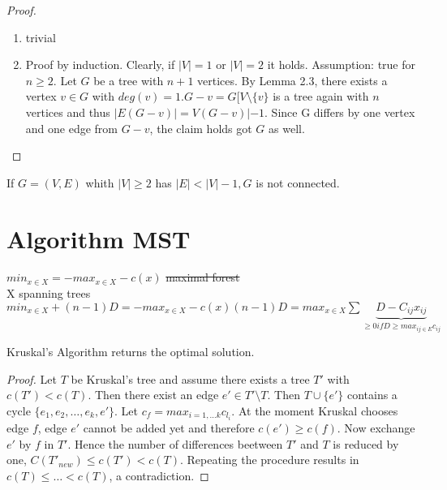 \begin{proof}



	\begin{enumerate}
		\item trivial
		\item Proof by induction. Clearly, if $|V|=1$ or $|V|=2$ it holds. Assumption: true for $n \geq 2.$
		Let $G$ be a tree with $n+1$ vertices. By Lemma 2.3, there exists a vertex $v \in G$ with $deg(v)=1. G-v=G[V\setminus \{v\}$ is a tree again with $n$ vertices and thus $|E(G-v)|=V(G-v)|-1$. Since G differs by one vertex and one edge from $G-v$, the claim holds got $G$ as well.
	\end{enumerate}
\end{proof}


\begin{lem}
If $G=(V,E)$ whith $|V| \geq 2$ has $|E|< |V|-1, G$ is not connected.
\end{lem}

\section*{Algorithm MST}
$min_{x \in X} = -max_{x \in X} -c(x)$ \sout{maximal forest}\\
X spanning trees\\
$min_{x \in X} + (n-1)D= -max_{x \in X} -c(x) (n-1)D =max_{x\in X} \sum \underbrace{D-C_{ij}x_{ij}}_{\geq 0 if D \geq max_{ij \in E} c_{ij}}$

\begin{thm}
Kruskal's Algorithm returns the optimal solution.
\end{thm}
\begin{proof}
Let $T$ be Kruskal's tree and assume there exists a tree $T'$ with $c(T') < c(T)$. Then there exist an edge $e' \in T'\setminus T$. Then $T \cup \{e'\} $ contains a cycle $\{e_1, e_2, \hdots, e_k, e'\}$. Let $ c_f=max_{i=1, \hdots k}c_{l_i} $. 
At the moment Kruskal chooses edge $f$, edge $e'$ cannot be added yet and therefore $c(e')\geq c(f)$. Now exchange $e'$ by $f$ in $T'$. Hence the number of differences beetween $T'$ and $T$ is reduced by one, $C(T'_{new})\leq c(T') < c(T)$. Repeating the procedure results in $c(T) \leq \hdots < c(T)$, a contradiction.
\end{proof}
